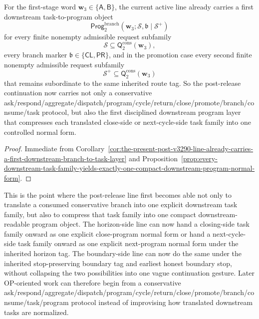 \begin{corollary}
\label{cor:the-present-post-v3290-line-already-carries-a-first-downstream-task-to-program-layer}
For the first-stage word \(\mathbf w_3\in\{\mathsf A,\mathsf B\}\), the current active line already carries a first downstream task-to-program object
\[
  \mathsf{Prog}^{\mathrm{branch}}_{2}(\mathbf w_3;\mathcal S,\mathfrak b\mid\mathcal S^{+})
\]
for every finite nonempty admissible request subfamily
\[
  \mathcal S\subseteq \mathsf{Q}^{\mathrm{cons}}_{2}(\mathbf w_3),
\]
every branch marker \(\mathfrak b\in\{\mathsf{CL},\mathsf{PR}\}\), and in the promotion case every second finite nonempty admissible request subfamily
\[
  \mathcal S^{+}\subseteq \mathsf{Q}^{\mathrm{cons}}_{2}(\mathbf w_3)
\]
that remains subordinate to the same inherited route tag. So the post-release continuation now carries not only a conservative ask/respond/aggregate/dispatch/program/cycle/return/close/promote/branch/consume/task protocol, but also the first disciplined downstream program layer that compresses each translated close-side or next-cycle-side task family into one controlled normal form.
\end{corollary}

\begin{proof}
Immediate from Corollary~\ref{cor:the-present-post-v3290-line-already-carries-a-first-downstream-branch-to-task-layer} and Proposition~\ref{prop:every-downstream-task-family-yields-exactly-one-compact-downstream-program-normal-form}.
\end{proof}

\begin{remark}
\label{rem:what-the-first-downstream-task-to-program-layer-now-buys}
This is the point where the post-release line first becomes able not only to translate a consumed conservative branch into one explicit downstream task family, but also to compress that task family into one compact downstream-readable program object. The horizon-side line can now hand a closing-side task family onward as one explicit close-program normal form or hand a next-cycle-side task family onward as one explicit next-program normal form under the inherited horizon tag. The boundary-side line can now do the same under the inherited stop-preserving boundary tag and earliest honest boundary stop, without collapsing the two possibilities into one vague continuation gesture. Later OP-oriented work can therefore begin from a conservative ask/respond/aggregate/dispatch/program/cycle/return/close/promote/branch/consume/task/program protocol instead of improvising how translated downstream tasks are normalized.
\end{remark}



